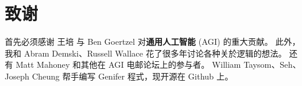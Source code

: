 \documentclass[12pt]{article}
\begin{document}

\section*{致谢}

首先必须感谢 王培 \cite{Wang2006} \cite{Wang2013} 与 Ben Goertzel \cite{Goertzel2011} 对\textbf{通用人工智能} (AGI) 的重大贡献。  此外，我和 Abram Demski、Russell Wallace 花了很多年讨论各种关於逻辑的想法。  还有 Matt Mahoney 和其他在 AGI 电邮论坛上的参与者。 William Taysom、Seh、Joseph Cheung 帮手编写 Genifer 程式，现开源在 Github 上。



\onecolumn

\end{document}
